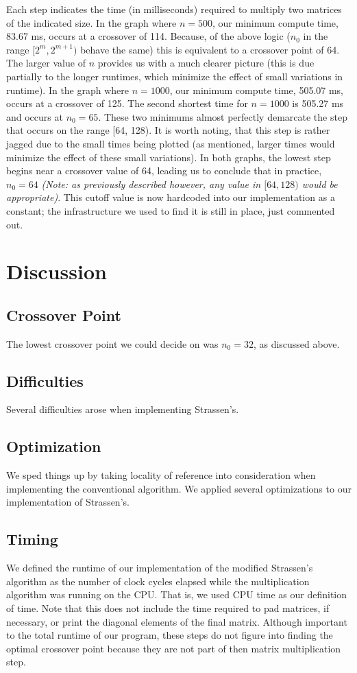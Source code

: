 \documentclass[solution, letterpaper]{cs121}
\begin{document}
Each step indicates the time (in milliseconds) required to multiply two matrices of the indicated size. In the graph where $n=500$, our minimum compute time, 83.67 ms, occurs at a crossover of 114. Because, of the above logic ($n_0$ in the range $[2^m,2^{m+1})$ behave the same) this is equivalent to a crossover point of 64. The larger value of $n$ provides us with a much clearer picture (this is due partially to the longer runtimes, which minimize the effect of small variations in runtime). In the graph where $n=1000$, our minimum compute time, 505.07 ms, occurs at a crossover of 125. The second shortest time for $n = 1000$ is 505.27 ms and occurs at $n_0 = 65$. These two minimums almost perfectly demarcate the step that occurs on the range [64, 128). It is worth noting, that this step is rather jagged due to the small times being plotted (as mentioned, larger times would minimize the effect of these small variations). In both graphs, the lowest step begins near a crossover value of 64, leading us to conclude that in practice, $n_0 = 64$ \textit{(Note: as previously described however, any value in $[64,128)$ would be appropriate)}. This cutoff value is now hardcoded into our implementation as a constant; the infrastructure we used to find it is still in place, just commented out.

\section*{Discussion}

\subsection*{Crossover Point}
The lowest crossover point we could decide on was $n_0 = 32$, as discussed above.

\subsection*{Difficulties}
Several difficulties arose when implementing Strassen's.

\subsection*{Optimization}
We sped things up by taking locality of reference into consideration when implementing the conventional algorithm. We applied several optimizations to our implementation of Strassen's.

\subsection*{Timing}
We defined the runtime of our implementation of the modified Strassen's algorithm as the number of clock cycles elapsed while the multiplication algorithm was running on the CPU. That is, we used CPU time as our definition of time. Note that this does not include the time required to pad matrices, if necessary, or print the diagonal elements of the final matrix. Although important to the total runtime of our program, these steps do not figure into finding the optimal crossover point because they are not part of then matrix multiplication step.
\end{document}
